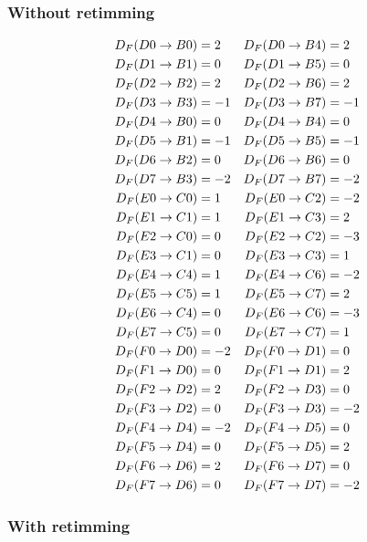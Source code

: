 \documentclass[a4paper, 10pt, conference]{ieeeconf}
\begin{document}
\subsubsection{Without retimming\label{sec:appen:folding_eq}}
\begin{small}
\begin{align*}\small
D_F(D0\to B0)&=2 &  D_F(D0\to B4)&=2\\
D_F(D1\to B1)&=0 &  D_F(D1\to B5)&=0\\
D_F(D2\to B2)&=2 &  D_F(D2\to B6)&=2\\
D_F(D3\to B3)&=-1& D_F(D3\to B7)&=-1\\
D_F(D4\to B0)&=0 &  D_F(D4\to B4)&=0\\
D_F(D5\to B1)&=-1& D_F(D5\to B5)&=-1\\
D_F(D6\to B2)&=0 &  D_F(D6\to B6)&=0\\
D_F(D7\to B3)&=-2& D_F(D7\to B7)&=-2\\
D_F(E0\to C0)&=1 &  D_F(E0\to C2)&=-2\\
D_F(E1\to C1)&=1 &  D_F(E1\to C3)&=2\\
D_F(E2\to C0)&=0 &  D_F(E2\to C2)&=-3\\
D_F(E3\to C1)&=0 &  D_F(E3\to C3)&=1\\
D_F(E4\to C4)&=1 &  D_F(E4\to C6)&=-2\\
D_F(E5\to C5)&=1 &  D_F(E5\to C7)&=2\\
D_F(E6\to C4)&=0 &  D_F(E6\to C6)&=-3\\
D_F(E7\to C5)&=0 &  D_F(E7\to C7)&=1\\
D_F(F0\to D0)&=-2& D_F(F0\to D1)&=0\\
D_F(F1\to D0)&=0 &  D_F(F1\to D1)&=2\\
D_F(F2\to D2)&=2 &  D_F(F2\to D3)&=0\\
D_F(F3\to D2)&=0 &  D_F(F3\to D3)&=-2\\
D_F(F4\to D4)&=-2&  D_F(F4\to D5)&=0\\
D_F(F5\to D4)&=0 &  D_F(F5\to D5)&=2\\
D_F(F6\to D6)&=2 &  D_F(F6\to D7)&=0\\
D_F(F7\to D6)&=0 &  D_F(F7\to D7)&=-2\\
\end{align*}
\end{small}

\subsubsection{With retimming\label{sec:appen:folding_eq_ret}}
\end{document}
